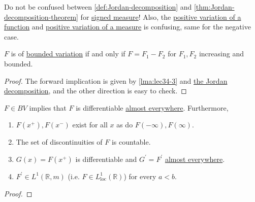 \begin{note}
	Do not be confused between \autoref{def:Jordan-decomposition} and \autoref{thm:Jordan-decomposition-theorem}
	for \hyperref[def:signed-measure]{signed measure}! Also, the \hyperref[def:positive-variation-function]{positive variation of a function}
	and \hyperref[def:positive-variation-measure]{positive variation of a measure} is confusing, same for the negative case.
\end{note}

\begin{theorem}\label{thm:lec-34}
	\(F\) is of \hyperref[def:bounded-variation]{bounded variation} if and only if \(F = F_1 - F_2\) for \(F_1,F_2\) increasing and bounded.
\end{theorem}
\begin{proof}
	The forward implication is given by \autoref{lma:lec34-3} and \hyperref[def:Jordan-decomposition]{the Jordan decomposition}, and the other
	direction is easy to check.
\end{proof}

\begin{corollary}
	\(F \in BV\) implies that \(F\) is differentiable \hyperref[def:mu-almost-everywhere]{almost everywhere}. Furthermore,
	\begin{enumerate}[(1)]
		\item \(F(x^+),F(x^-)\) exist for all \(x\) as do \(F(-\infty),F(\infty)\).
		\item The set of discontinuities of \(F\) is countable.
		\item \(G(x) = F(x^+)\) is differentiable and \(G^\prime = F^\prime\) \hyperref[def:mu-almost-everywhere]{almost everywhere}.
		\item \(F^\prime \in L^1(\mathbb{R}, m)\) (i.e. \(F \in L^1_{\operatorname{loc}}(\mathbb{R})\)) for every \(a < b\).
	\end{enumerate}
\end{corollary}
\begin{proof}
\end{proof}